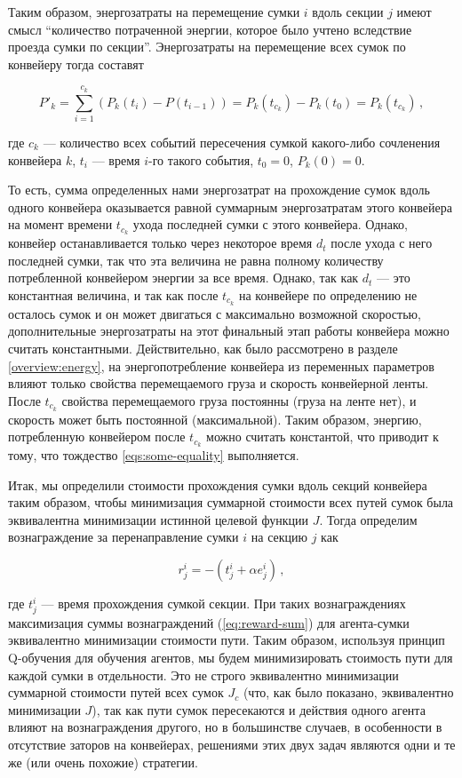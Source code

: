 \documentclass[specification,annotation,times]{itmo-student-thesis}
\theoremstyle{definition}
\begin{document}
Таким образом, энергозатраты на перемещение сумки $i$ вдоль секции $j$
имеют смысл ``количество потраченной энергии, которое было учтено вследствие
проезда сумки по секции''. Энергозатраты на перемещение всех сумок по конвейеру
тогда составят

\begin{equation}
  P'_k = \sum\limits_{i=1}^{c_k} (P_k(t_i) - P(t_{i-1})) = P_k(t_{c_k}) -
  P_k(t_0) = P_k(t_{c_k}) \,,
\end{equation}

где $c_k$ --- количество всех событий пересечения сумкой какого-либо сочленения
конвейера $k$, $t_i$ --- время $i$-го такого события, $t_0 = 0$, $P_k(0) = 0$.

То есть, сумма определенных нами энергозатрат на прохождение сумок вдоль одного
конвейера оказывается равной суммарным энергозатратам этого конвейера на момент
времени $t_{c_k}$ ухода последней сумки с этого конвейера. Однако, конвейер
останавливается только через некоторое время $d_t$ после ухода с него последней
сумки, так что эта величина не равна полному количеству потребленной конвейером
энергии за все время. Однако, так как $d_t$ --- это константная величина, и так
как после $t_{c_k}$ на конвейере по определению не осталось сумок и он может
двигаться с максимально возможной скоростью, дополнительные энергозатраты на
этот финальный этап работы конвейера можно считать константными. Действительно,
как было рассмотрено в разделе \ref{overview:energy}, на энергопотребление
конвейера из переменных параметров влияют только свойства перемещаемого груза и
скорость конвейерной ленты. После $t_{c_k}$ свойства перемещаемого груза
постоянны (груза на ленте нет), и скорость может быть постоянной (максимальной).
Таким образом, энергию, потребленную конвейером после $t_{c_k}$ можно считать
константой, что приводит к тому, что тождество \ref{eqs:some-equality}
выполняется.

Итак, мы определили стоимости прохождения сумки вдоль секций конвейера таким
образом, чтобы минимизация суммарной стоимости всех путей сумок была
эквивалентна минимизации истинной целевой функции $J$. Тогда определим
вознаграждение за перенаправление сумки $i$ на секцию $j$ как

\begin{equation}
  r_j^i = -(t_j^i + \alpha e_j^i) \,,
\end{equation}

где $t_j^i$ --- время прохождения сумкой секции. При таких вознаграждениях
максимизация суммы вознаграждений (\ref{eq:reward-sum}) для агента-сумки
эквивалентно минимизации стоимости пути. Таким образом, используя принцип
Q-обучения для обучения агентов, мы будем минимизировать стоимость пути для
каждой сумки в отдельности. Это не строго эквивалентно минимизации суммарной
стоимости путей всех сумок $J_c$ (что, как было показано, эквивалентно
минимизации $J$), так как пути сумок пересекаются и действия одного агента
влияют на вознаграждения другого, но в большинстве случаев, в особенности в
отсутствие заторов на конвейерах, решениями этих двух задач являются одни и те
же (или очень похожие) стратегии.
\end{document}
